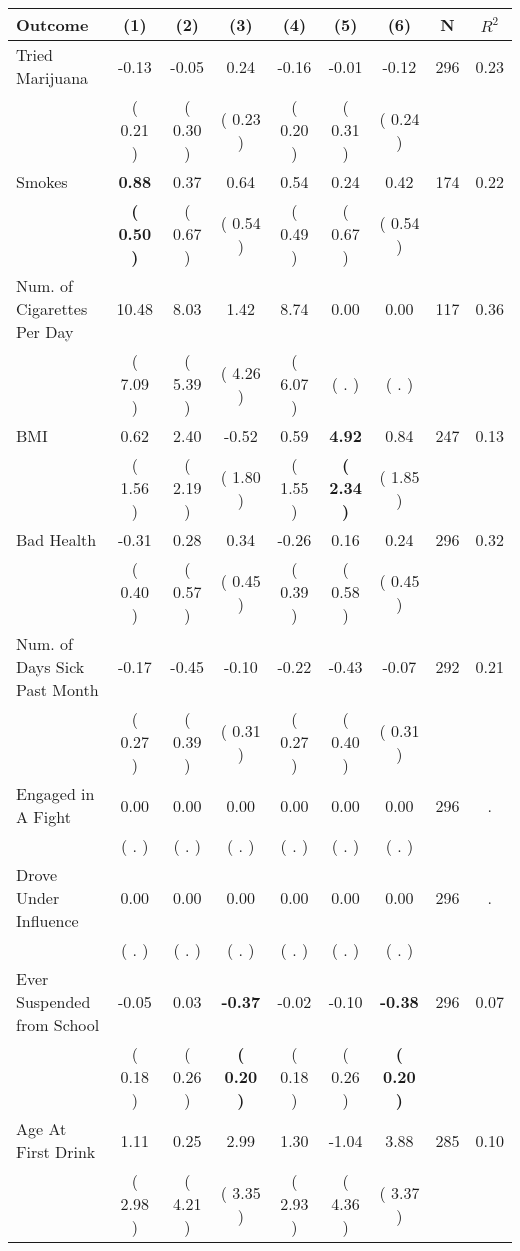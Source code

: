 \begin{tabular}{lcccccccc}
\toprule
 \textbf{Outcome} & \textbf{(1)} & \textbf{(2)} & \textbf{(3)} & \textbf{(4)} & \textbf{(5)} & \textbf{(6)} & \textbf{N} & \textbf{$ R^2$} \\
\midrule
Tried Marijuana &     -0.13 &     -0.05 &      0.24 &     -0.16 &     -0.01 &     -0.12 & 296 &       0.23 \\ 
 & (     0.21 ) & (     0.30 ) & (     0.23 ) & (     0.20 ) & (     0.31 ) & (     0.24 ) & \\
Smokes & \textbf{     0.88} &      0.37 &      0.64 &      0.54 &      0.24 &      0.42 & 174 &       0.22 \\ 
 & \textbf{(     0.50 )} & (     0.67 ) & (     0.54 ) & (     0.49 ) & (     0.67 ) & (     0.54 ) & \\
Num. of Cigarettes Per Day &     10.48 &      8.03 &      1.42 &      8.74 &      0.00 &      0.00 & 117 &       0.36 \\ 
 & (     7.09 ) & (     5.39 ) & (     4.26 ) & (     6.07 ) & (        . ) & (        . ) & \\
BMI &      0.62 &      2.40 &     -0.52 &      0.59 & \textbf{     4.92} &      0.84 & 247 &       0.13 \\ 
 & (     1.56 ) & (     2.19 ) & (     1.80 ) & (     1.55 ) & \textbf{(     2.34 )} & (     1.85 ) & \\
Bad Health &     -0.31 &      0.28 &      0.34 &     -0.26 &      0.16 &      0.24 & 296 &       0.32 \\ 
 & (     0.40 ) & (     0.57 ) & (     0.45 ) & (     0.39 ) & (     0.58 ) & (     0.45 ) & \\
Num. of Days Sick Past Month &     -0.17 &     -0.45 &     -0.10 &     -0.22 &     -0.43 &     -0.07 & 292 &       0.21 \\ 
 & (     0.27 ) & (     0.39 ) & (     0.31 ) & (     0.27 ) & (     0.40 ) & (     0.31 ) & \\
Engaged in A Fight &      0.00 &      0.00 &      0.00 &      0.00 &      0.00 &      0.00 & 296 &          . \\ 
 & (        . ) & (        . ) & (        . ) & (        . ) & (        . ) & (        . ) & \\
Drove Under Influence &      0.00 &      0.00 &      0.00 &      0.00 &      0.00 &      0.00 & 296 &          . \\ 
 & (        . ) & (        . ) & (        . ) & (        . ) & (        . ) & (        . ) & \\
Ever Suspended from School &     -0.05 &      0.03 & \textbf{    -0.37} &     -0.02 &     -0.10 & \textbf{    -0.38} & 296 &       0.07 \\ 
 & (     0.18 ) & (     0.26 ) & \textbf{(     0.20 )} & (     0.18 ) & (     0.26 ) & \textbf{(     0.20 )} & \\
Age At First Drink &      1.11 &      0.25 &      2.99 &      1.30 &     -1.04 &      3.88 & 285 &       0.10 \\ 
 & (     2.98 ) & (     4.21 ) & (     3.35 ) & (     2.93 ) & (     4.36 ) & (     3.37 ) & \\
\bottomrule
\end{tabular}
